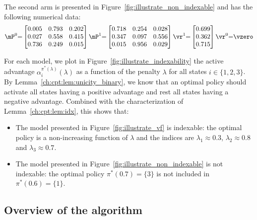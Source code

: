 The second arm is presented in Figure~\ref{fig:illustrate_non_indexable} and has the following numerical data:
\begin{equation*}
    \mP^0{=}\begin{bmatrix}
        0.005 & 0.793 & 0.202 \\
        0.027 & 0.558 & 0.415 \\
        0.736 & 0.249 & 0.015
    \end{bmatrix}
    \mP^1{=}\begin{bmatrix}
        0.718 & 0.254 & 0.028 \\
        0.347 & 0.097 & 0.556 \\
        0.015 & 0.956 & 0.029
    \end{bmatrix}
    \vr^1{=}\begin{bmatrix}
        0.699 \\
        0.362 \\
        0.715
    \end{bmatrix} \vr^0{=}\vzero
\end{equation*}

For each model, we plot in Figure~\ref{fig:illustrate_indexability} the active advantage $\alpha^{\pi^*(\lambda)}_i(\lambda)$ as a function of the penalty $\lambda$ for all states $i\in\{1,2,3\}$.
By Lemma~\ref{ch:cpt:lem:unicity_binary}, we know that an optimal policy should activate all states having a positive advantage and rest all states having a negative advantage.
Combined with the characterization of Lemma~\ref{ch:cpt:lem:idx}, this shows that:
\begin{itemize}
    \item The model presented in Figure~\ref{fig:illustrate_vf} is indexable: the optimal policy is a non-increasing function of $\lambda$ and the indices are $\lambda_1\approx0.3$, $\lambda_2\approx0.8$ and $\lambda_3\approx0.7$.
    \item The model presented in Figure~\ref{fig:illustrate_non_indexable} is not indexable: the optimal policy $\pi^*(0.7)=\{3\}$ is not included in $\pi^*(0.6)=\{1\}$. 
\end{itemize}

\subsection{Overview of the algorithm}
\label{ssec:informal_widx_algo}

